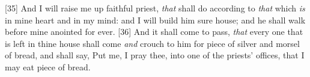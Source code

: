 [35] \textcolor[cmyk]{0.99998,1,0,0}{And I will raise me up  faithful priest, \emph{that} shall do according to \emph{that} which \emph{is} in mine heart and in my mind: and I will build him  sure house; and he shall walk before mine anointed for ever.}
[36] \textcolor[cmyk]{0.99998,1,0,0}{And it shall come to pass, \emph{that} every one that is left in thine house shall come \emph{and} crouch to him for  piece of silver and  morsel of bread, and shall say, Put me, I pray thee, into one of the priests' offices, that I may eat  piece of bread.}